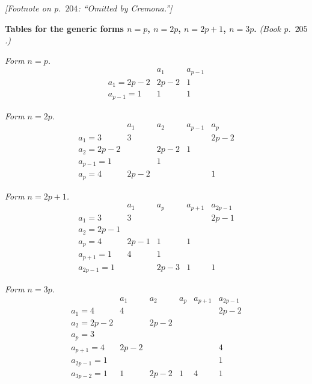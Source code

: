 \documentclass[11pt]{article}
\begin{document}
\noindent\textit{[Footnote on p.~$204$: ``Omitted by Cremona.'']}

\medskip


\noindent\textbf{Tables for the generic forms $n=p$, $n=2p$, $n=2p+1$, $n=3p$.}
\emph{(Book p.~$205$.)}

\medskip

\noindent\textit{Form $n=p$.}
\[
\begin{array}{l|cc}
              & a_{1}      & a_{p-1}\\
\hline
a_{1}=2p-2    & 2p-2       & 1\\
a_{p-1}=1     & 1          & 1
\end{array}
\]

\noindent\textit{Form $n=2p$.}
\[
\begin{array}{l|cccc}
              & a_{1} & a_{2} & a_{p-1} & a_{p}\\
\hline
a_{1}=3       & 3     &       &         & 2p-2\\
a_{2}=2p-2    &       & 2p-2  & 1       & \\
a_{p-1}=1     &       & 1     &         & \\
a_{p}=4       & 2p-2  &       &         & 1
\end{array}
\]

\noindent\textit{Form $n=2p+1$.}
\[
\begin{array}{l|cccc}
              & a_{1} & a_{p}   & a_{p+1} & a_{2p-1}\\
\hline
a_{1}=3       & 3     &         &         & 2p-1\\
a_{2}=2p-1    &       &         &         & \\
a_{p}=4       & 2p-1  & 1       & 1       & \\
a_{p+1}=1     & 4     & 1       &         & \\
a_{2p-1}=1    &       & 2p-3    & 1       & 1
\end{array}
\]

\noindent\textit{Form $n=3p$.}
\[
\begin{array}{l|ccccc}
              & a_{1} & a_{2} & a_{p} & a_{p+1} & a_{2p-1}\\
\hline
a_{1}=4       & 4     &       &       &         & 2p-2\\
a_{2}=2p-2    &       & 2p-2  &       &         & \\
a_{p}=3       &       &       &       &         & \\
a_{p+1}=4     & 2p-2  &       &       &         & 4\\
a_{2p-1}=1    &       &       &       &         & 1\\
a_{3p-2}=1    & 1     & 2p-2  & 1     & 4       & 1
\end{array}
\]
\end{document}
